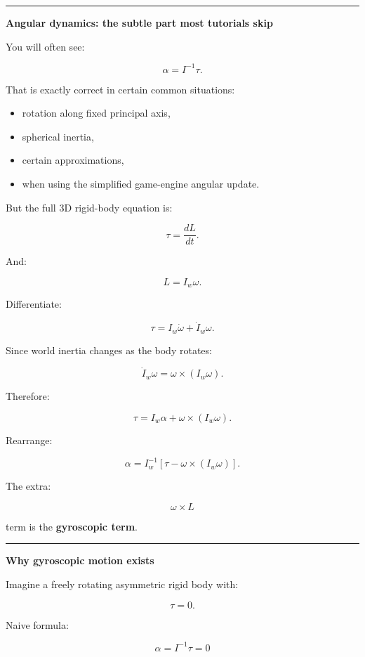 \begin{center}\rule{0.5\linewidth}{0.5pt}\end{center}

\textbf{Angular dynamics: the subtle part most tutorials skip}

You will often see:

\[
\alpha
=
I^{-1}\tau.
\]

That is exactly correct in certain common situations:

\begin{itemize}
\tightlist
\item
  rotation along fixed principal axis,
\item
  spherical inertia,
\item
  certain approximations,
\item
  when using the simplified game-engine angular update.
\end{itemize}

But the full 3D rigid-body equation is:

\[
\boxed{
\tau
=
\frac{dL}{dt}.
}
\]

And:

\[
L=I_w\omega.
\]

Differentiate:

\[
\tau
=
I_w\dot\omega
+
\dot I_w\omega.
\]

Since world inertia changes as the body rotates:

\[
\dot I_w\omega
=
\omega\times(I_w\omega).
\]

Therefore:

\[
\boxed{
\tau
=
I_w\alpha
+
\omega\times(I_w\omega).
}
\]

Rearrange:

\[
\boxed{
\alpha
=
I_w^{-1}
\left[
\tau
-
\omega\times(I_w\omega)
\right].
}
\]

The extra:

\[
\omega\times L
\]

term is the \textbf{gyroscopic term}.

\begin{center}\rule{0.5\linewidth}{0.5pt}\end{center}

\textbf{Why gyroscopic motion exists}

Imagine a freely rotating asymmetric rigid body with:

\[
\tau=0.
\]

Naive formula:

\[
\alpha=I^{-1}\tau=0
\]


